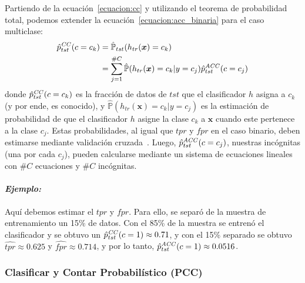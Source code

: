 Partiendo de la ecuación~\ref{ecuacion:cc} y utilizando el teorema de
probabilidad total, podemos extender la ecuación~\ref{ecuacion:acc_binaria} para
el caso multiclase:
\begin{align}
\begin{split}
    \hat p^{\it CC\/}_{tst}(c=c_k) &= \mathbb{\hat P}_{tst}(h_{tr}(\boldsymbol{x})=c_k) \\
    &= \sum \limits_{j=1}^{\#C}{\mathbb{\hat P}(h_{tr}(\boldsymbol{x})=c_k|y=c_j) \hat p^{\it ACC\/}_{tst}(c=c_j)}\label{ecuacion:acc_multiclase}
\end{split}
\end{align}
donde \(\hat p^{\it CC\/}_{tst}(c=c_k)\) es la fracción de datos de \(tst\) que
el clasificador \(h\) asigna a \(c_k\) (y por ende, es conocido), y
\(\mathbb{\hat{P}}(h_{tr}(\boldsymbol{x})=c_k|y=c_j)\) es la estimación de
probabilidad de que el clasificador \(h\) asigne la clase \(c_k\) a
\(\boldsymbol{x}\) cuando este pertenece a la clase \(c_j\). Estas
probabilidades, al igual que \(tpr\) y \(fpr\) en el caso binario, deben
estimarse mediante validación cruzada~\cite{barranquero2013study,
forman2005counting, forman2008quantifying}. Luego, \(\hat p^{\it
ACC\/}_{tst}(c=c_j)\), nuestras incógnitas (una por cada \(c_j\)), pueden
calcularse mediante un sistema de ecuaciones lineales con \(\#C\) ecuaciones y
\(\#C\) incógnitas.

\paragraph{\it Ejemplo:\/} Aquí debemos estimar el \(tpr\) y \(fpr\). Para ello,
se separó de la muestra de entrenamiento un 15\% de datos. Con el 85\% de la
muestra se entrenó el clasificador y se obtuvo un \(\hat p^{\it CC\/}_{tst}(c=1)
\approx 0.71\), y con el 15\% separado se obtuvo \(\hat{tpr} \approx 0.625\) y
\(\hat{fpr} \approx 0.714\), y por lo tanto, \(\hat p^{\it ACC\/}_{tst}(c=1)
\approx 0.0516\).

\subsubsection{Clasificar y Contar Probabilístico (PCC)}\label{estimacion:pcc}

